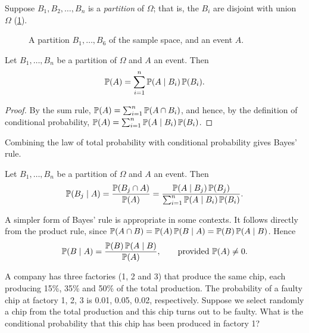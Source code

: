 Suppose $B_1, B_2, \ldots, B_n$ is a \emph{partition} of $\Omega$; that is, the $B_i$ are disjoint with union $\Omega$ (\cref{fig:partition}).

\begin{figure}[H]
\centering
{}
\caption{A partition $B_1, \ldots, B_6$ of the sample space, and an event $A$.}
\label{fig:partition}
\end{figure}

\begin{theorem}\label{thm:total-probability}
Let $B_1, \ldots, B_n$ be a partition of $\Omega$ and $A$ an event. Then
\[
  \mathbb{P}(A) = \sum_{i=1}^n \mathbb{P}(A \mid B_i)\,\mathbb{P}(B_i).
\]
\end{theorem}

\begin{proof}
By the sum rule, $\mathbb{P}(A) = \sum_{i=1}^n \mathbb{P}(A \cap B_i)$, and hence, by the definition of conditional probability, $\mathbb{P}(A) = \sum_{i=1}^n \mathbb{P}(A \mid B_i)\,\mathbb{P}(B_i)$.
\end{proof}

Combining the law of total probability with conditional probability gives Bayes' rule.

\begin{theorem}\label{thm:bayes-rule}
Let $B_1, \ldots, B_n$ be a partition of $\Omega$ and $A$ an event. Then
\[
  \mathbb{P}(B_j \mid A) = \frac{\mathbb{P}(B_j \cap A)}{\mathbb{P}(A)} = \frac{\mathbb{P}(A \mid B_j)\,\mathbb{P}(B_j)}{\sum_{i=1}^n \mathbb{P}(A \mid B_i)\,\mathbb{P}(B_i)}.
\]
\end{theorem}

A simpler form of Bayes' rule is appropriate in some contexts. It follows directly from the product rule, since $\mathbb{P}(A \cap B) = \mathbb{P}(A)\,\mathbb{P}(B \mid A) = \mathbb{P}(B)\,\mathbb{P}(A \mid B)$. Hence
\[
  \mathbb{P}(B \mid A) = \frac{\mathbb{P}(B)\,\mathbb{P}(A \mid B)}{\mathbb{P}(A)}, \qquad \text{provided } \mathbb{P}(A) \ne 0.
\]

\begin{example}\label{ex:three-factories}
A company has three factories (1, 2 and 3) that produce the same chip, each producing 15\%, 35\% and 50\% of the total production. The probability of a faulty chip at factory 1, 2, 3 is 0.01, 0.05, 0.02, respectively. Suppose we select randomly a chip from the total production and this chip turns out to be faulty. What is the conditional probability that this chip has been produced in factory 1?
\end{example}

